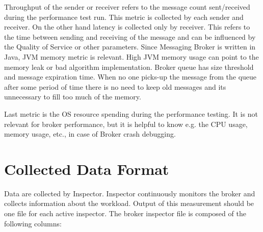 
Throughput of the sender or receiver refers to the message count sent/received during the performance test run. This metric is collected by each sender and receiver. On the other hand latency is collected only by receiver. This refers to the time between sending and receiving of the message and can be influenced by the Quality of Service or other parameters. Since Messaging Broker is written in Java, JVM memory metric is relevant. High JVM memory usage can point to the memory leak or bad algorithm implementation. Broker queue has size threshold and message expiration time. When no one picks-up the message from the queue after some period of time there is no need to keep old messages and its unnecessary to fill too much of the memory.

Last metric is the OS resource spending during the performance testing. It is not relevant for broker performance, but it is helpful to know e.g. the CPU usage, memory usage, etc., in case of Broker crash debugging.

\section{Collected Data Format}
\label{Collected Data Format}
Data are collected by Inspector. Inspector continuously monitors the broker and collects information about the workload. Output of this measurement should be one file for each active inspector. The broker inspector file is composed of the following columns:

